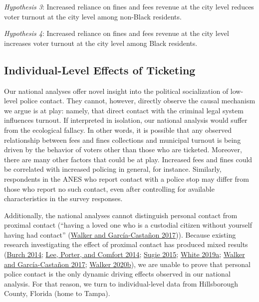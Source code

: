 \documentclass[
  12pt,
]{article}
\begin{document}
\emph{Hypothesis 3}: Increased reliance on fines and fees revenue at the city level reduces voter turnout at the city level among non-Black residents.

\emph{Hypothesis 4}: Increased reliance on fines and fees revenue at the city level increases voter turnout at the city level among Black residents.

\hypertarget{individual-level-effects-of-ticketing}{%
\subsection*{Individual-Level Effects of Ticketing}\label{individual-level-effects-of-ticketing}}

Our national analyses offer novel insight into the political socialization of low-level police contact. They cannot, however, directly observe the causal mechanism we argue is at play: namely, that direct contact with the criminal legal system influences turnout. If interpreted in isolation, our national analysis would suffer from the ecological fallacy. In other words, it is possible that any observed relationship between fees and fines collections and municipal turnout is being driven by the behavior of voters other than those who are ticketed. Moreover, there are many other factors that could be at play. Increased fees and fines could be correlated with increased policing in general, for instance. Similarly, respondents in the ANES who report contact with a police stop may differ from those who report no such contact, even after controlling for available characteristics in the survey responses.

Additionally, the national analyses cannot distinguish personal contact from proximal contact (``having a loved one who is a custodial citizen without yourself having had contact'' (\protect\hyperlink{ref-Walker2017}{Walker and García-Castañon 2017})). Because existing research investigating the effect of proximal contact has produced mixed results (\protect\hyperlink{ref-Burch2014}{Burch 2014}; \protect\hyperlink{ref-Lee2014}{Lee, Porter, and Comfort 2014}; \protect\hyperlink{ref-Sugie2015}{Sugie 2015}; \protect\hyperlink{ref-White2019}{White 2019a}; \protect\hyperlink{ref-Walker2017}{Walker and García-Castañon 2017}; \protect\hyperlink{ref-Walker2020}{Walker 2020b}), we are unable to prove that personal police contact is the only dynamic driving effects observed in our national analysis. For that reason, we turn to individual-level data from Hillsborough County, Florida (home to Tampa).
\end{document}
